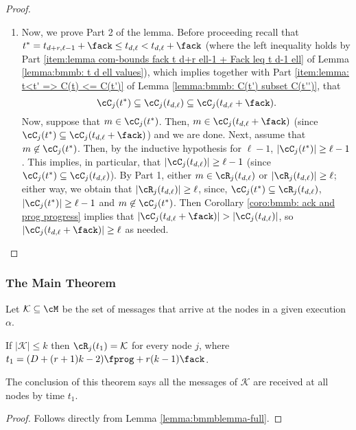 \begin{proof}
\begin{enumerate}
\item Now, we prove Part 2 of the lemma.
Before proceeding recall that
$t^*=t_{d+r,\ell-1}+\fack \leq t_{d,\ell} < t_{d,\ell}+\fack$
(where the left inequality holds
by Part
\ref{item:lemma com-bounds fack t d+r ell-1 + Fack leq t d-1 ell}
of Lemma
\ref{lemma:bmmb: t d ell values}), which implies together with
Part \ref{item:lemma: t<t' => C(t) <= C(t')}
of Lemma \ref{lemma:bmmb: C(t') subset C(t'')}, that
$$
\cC_j(t^*) \subseteq \cC_j(t_{d,\ell}) \subseteq \cC_j(t_{d,\ell}+\fack).
$$
Now, suppose that $m\in \cC_j(t^*)$.
Then,
$m\in \cC_{j}(t_{d,\ell}+\fack)$
(since $\cC_{j}(t^*) \subseteq \cC_{j}(t_{d,\ell}+\fack)$) and we are done.
Next, assume that $m\not\in \cC_j(t^*)$.
Then,  by the inductive hypothesis for $\ell-1$, $|\cC_j(t^*)| \geq \ell-1$.
This implies, in particular, that
$|\cC_j(t_{d,\ell})| \geq \ell-1$
(since $\cC_j(t^*)\subseteq \cC_j(t_{d,\ell})$).
By Part 1, either $m\in \cR_j(t_{d,\ell})$ or $|\cR_j(t_{d,\ell})|\geq \ell$;
either way, we obtain that $|\cR_j(t_{d,\ell})|\geq \ell$, since, $\cC_j(t^*)\subseteq \cR_j(t_{d,\ell})$, $|\cC_j(t^*)|\geq \ell-1$ and $m\not\in \cC_j(t^*)$.
Then Corollary \ref{coro:bmmb: ack and prog progress} implies that
$|\cC_j(t_{d,\ell}+\fack)|>|\cC_j(t_{d,\ell})|$, so
$|\cC_j(t_{d,\ell}+\fack)|\geq \ell$ as needed.

\end{enumerate}
\end{proof}



\subsubsection{The Main Theorem}

Let $\mathcal{K}\subseteq \cM$ be the set of messages that arrive at the nodes in a given execution $\alpha$.


\begin{theorem}
\label{thm:bmmb:time-full}
If $|\mathcal{K}| \leq k$ then $\cR_j(t_1)=\mathcal{K}$ for every node $j$,
where $t_1 = (D + (r+1)k - 2) \fprog + r(k-1) \fack$.
\end{theorem}
The conclusion of this theorem says all the messages of $\mathcal{K}$ are received at all
nodes by time $t_1$.
\begin{proof}
Follows directly from Lemma \ref{lemma:bmmblemma-full}.
\end{proof}













